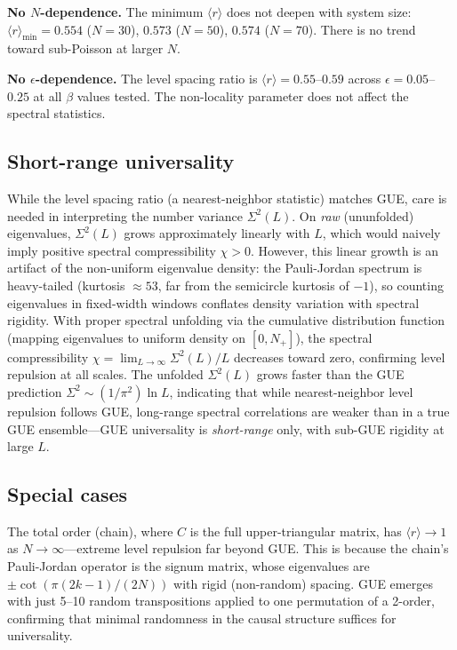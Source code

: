 \documentclass[aps,prd,twocolumn,superscriptaddress,nofootinbib]{revtex4-2}
\begin{document}
\textbf{No $N$-dependence.} The minimum $\langle r \rangle$ does not deepen with system size: $\langle r \rangle_{\min} = 0.554$ ($N = 30$), $0.573$ ($N = 50$), $0.574$ ($N = 70$). There is no trend toward sub-Poisson at larger $N$.

\textbf{No $\epsilon$-dependence.} The level spacing ratio is $\langle r \rangle = 0.55$--$0.59$ across $\epsilon = 0.05$--$0.25$ at all $\beta$ values tested. The non-locality parameter does not affect the spectral statistics.

\subsection{Short-range universality}

While the level spacing ratio (a nearest-neighbor statistic) matches GUE, care is needed in interpreting the number variance $\Sigma^2(L)$. On \emph{raw} (ununfolded) eigenvalues, $\Sigma^2(L)$ grows approximately linearly with $L$, which would naively imply positive spectral compressibility $\chi > 0$. However, this linear growth is an artifact of the non-uniform eigenvalue density: the Pauli-Jordan spectrum is heavy-tailed (kurtosis $\approx 53$, far from the semicircle kurtosis of $-1$), so counting eigenvalues in fixed-width windows conflates density variation with spectral rigidity. With proper spectral unfolding via the cumulative distribution function (mapping eigenvalues to uniform density on $[0, N_+]$), the spectral compressibility $\chi = \lim_{L \to \infty} \Sigma^2(L)/L$ decreases toward zero, confirming level repulsion at all scales. The unfolded $\Sigma^2(L)$ grows faster than the GUE prediction $\Sigma^2 \sim (1/\pi^2)\ln L$, indicating that while nearest-neighbor level repulsion follows GUE, long-range spectral correlations are weaker than in a true GUE ensemble---GUE universality is \emph{short-range} only, with sub-GUE rigidity at large $L$.

\subsection{Special cases}

The total order (chain), where $C$ is the full upper-triangular matrix, has $\langle r \rangle \to 1$ as $N \to \infty$---extreme level repulsion far beyond GUE. This is because the chain's Pauli-Jordan operator is the signum matrix, whose eigenvalues are $\pm \cot(\pi(2k-1)/(2N))$ with rigid (non-random) spacing. GUE emerges with just 5--10 random transpositions applied to one permutation of a 2-order, confirming that minimal randomness in the causal structure suffices for universality.
\end{document}
